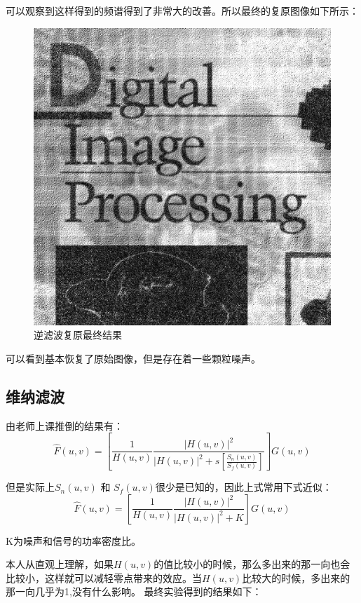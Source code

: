 \documentclass{article}
\begin{document}
		可以观察到这样得到的频谱得到了非常大的改善。所以最终的复原图像如下所示：
		
		\begin{figure}[H]
			\centering
			\includegraphics[scale = 0.5]{result1.png}
			\caption{逆滤波复原最终结果}
		\end{figure}
		
		可以看到基本恢复了原始图像，但是存在着一些颗粒噪声。
	
		\subsection{维纳滤波}
		由老师上课推倒的结果有：
		$$\hat{F}(u,v) = [\frac{1}{H(u ,v)}\frac{|H(u,v)|^2}{|H(u,v)|^2+s[\frac{S_n(u,v)}{S_f(u ,v)}]}]G(u ,v)$$
		
		但是实际上$S_n(u , v)$ 和 $S_f(u ,v)$很少是已知的，因此上式常用下式近似：
		$$ \hat{F}(u ,v) = [\frac{1}{H(u ,v)}   \frac{|H(u ,v)|^2}{|H(u,v)|^2 + K}]G(u ,v)$$
		
		K为噪声和信号的功率密度比。
		
		本人从直观上理解，如果$H(u ,v)$的值比较小的时候，那么多出来的那一向也会比较小，这样就可以减轻零点带来的效应。当$H(u,v)$比较大的时候，多出来的那一向几乎为1,没有什么影响。
		最终实验得到的结果如下：
		
\end{document}

